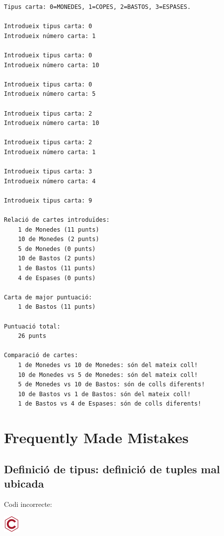 \documentclass[
]{book}
\begin{document}
\begin{verbatim}
Tipus carta: 0=MONEDES, 1=COPES, 2=BASTOS, 3=ESPASES.

Introdueix tipus carta: 0
Introdueix número carta: 1

Introdueix tipus carta: 0
Introdueix número carta: 10

Introdueix tipus carta: 0
Introdueix número carta: 5

Introdueix tipus carta: 2
Introdueix número carta: 10

Introdueix tipus carta: 2
Introdueix número carta: 1

Introdueix tipus carta: 3
Introdueix número carta: 4

Introdueix tipus carta: 9

Relació de cartes introduïdes: 
    1 de Monedes (11 punts) 
    10 de Monedes (2 punts) 
    5 de Monedes (0 punts) 
    10 de Bastos (2 punts) 
    1 de Bastos (11 punts) 
    4 de Espases (0 punts) 

Carta de major puntuació: 
    1 de Bastos (11 punts) 

Puntuació total: 
    26 punts 

Comparació de cartes: 
    1 de Monedes vs 10 de Monedes: són del mateix coll!
    10 de Monedes vs 5 de Monedes: són del mateix coll!
    5 de Monedes vs 10 de Bastos: són de colls diferents!
    10 de Bastos vs 1 de Bastos: són del mateix coll!
    1 de Bastos vs 4 de Espases: són de colls diferents!
\end{verbatim}

\hypertarget{frequently-made-mistakes-4}{%
\section{Frequently Made Mistakes}\label{frequently-made-mistakes-4}}

\hypertarget{definiciuxf3-de-tipus-definiciuxf3-de-tuples-mal-ubicada}{%
\subsection{Definició de tipus: definició de tuples mal ubicada}\label{definiciuxf3-de-tipus-definiciuxf3-de-tuples-mal-ubicada}}

Codi incorrecte:

\includegraphics{./img/c_err.png}
\end{document}
